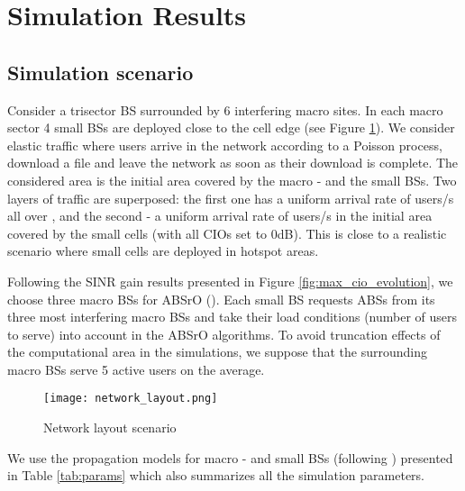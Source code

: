 \documentclass[conference]{IEEEtran}
\begin{document}
\section{Simulation Results} \label{sec:perf_results}
\subsection{Simulation scenario}
	Consider a trisector \ac{BS} surrounded by 6 interfering macro sites. In each macro sector 4 small \acp{BS} are deployed close to the cell edge (see Figure \ref{fig:net_lay}). We consider elastic traffic where users arrive in the network according to a Poisson process, download a file and leave the network as soon as their download is complete. The considered area  is the initial area covered by the macro - and the small \acp{BS}. Two layers of traffic are superposed: the first one has a uniform arrival rate of  users/s all over , and the second - a uniform arrival rate of  users/s in the initial area covered by the small cells (with all \acp{CIO} set to 0dB). This is close to a realistic scenario where small cells are deployed in hotspot areas.
	
	Following the \ac{SINR} gain results presented in Figure \ref{fig:max_cio_evolution}, we choose three macro \acp{BS} for \ac{ABSrO} (). Each small \ac{BS} requests \acp{ABS} from its three most interfering macro \acp{BS} and take their load conditions (number of users to serve) into account in the \ac{ABSrO} algorithms. To avoid truncation effects of the computational area in the simulations, we suppose that the surrounding macro \acp{BS} serve 5 active users on the average.

\begin{figure}[!ht]
\centering
\texttt{[image: network\_layout.png]}
\caption{Network layout scenario}
\label{fig:net_lay}
\end{figure}

	We use the propagation models for macro - and small \acp{BS} (following \cite[Page 61]{3gpp.36.814-R9}) presented in Table \ref{tab:params} which also summarizes all the simulation parameters.
	
\end{document}
